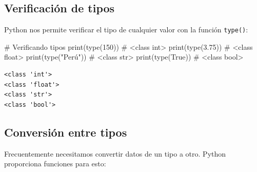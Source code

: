 \documentclass[
  doc,
  floatsintext,
  longtable,
  a4paper,
  nolmodern,
  notxfonts,
  notimes,
  12pt,
  colorlinks=true,linkcolor=blue,citecolor=blue,urlcolor=blue]{apa7}
\newenvironment{Shaded}{\begin{snugshade}}{\end{snugshade}}
\newcommand{\BuiltInTok}[1]{\textcolor[rgb]{0.00,0.23,0.31}{#1}}
\newcommand{\CommentTok}[1]{\textcolor[rgb]{0.37,0.37,0.37}{#1}}
\newcommand{\DecValTok}[1]{\textcolor[rgb]{0.68,0.00,0.00}{#1}}
\newcommand{\FloatTok}[1]{\textcolor[rgb]{0.68,0.00,0.00}{#1}}
\newcommand{\NormalTok}[1]{\textcolor[rgb]{0.00,0.23,0.31}{#1}}
\newcommand{\StringTok}[1]{\textcolor[rgb]{0.13,0.47,0.30}{#1}}
\newcommand{\VariableTok}[1]{\textcolor[rgb]{0.07,0.07,0.07}{#1}}
\begin{document}
\subsection{Verificación de tipos}\label{verificaciuxf3n-de-tipos}

Python nos permite verificar el tipo de cualquier valor con la función
\texttt{type()}:

\begin{Shaded}
\begin{Highlighting}[]
\CommentTok{\# Verificando tipos}
\BuiltInTok{print}\NormalTok{(}\BuiltInTok{type}\NormalTok{(}\DecValTok{150}\NormalTok{))           }\CommentTok{\# \textless{}class \textquotesingle{}int\textquotesingle{}\textgreater{}}
\BuiltInTok{print}\NormalTok{(}\BuiltInTok{type}\NormalTok{(}\FloatTok{3.75}\NormalTok{))          }\CommentTok{\# \textless{}class \textquotesingle{}float\textquotesingle{}\textgreater{}}
\BuiltInTok{print}\NormalTok{(}\BuiltInTok{type}\NormalTok{(}\StringTok{"Perú"}\NormalTok{))        }\CommentTok{\# \textless{}class \textquotesingle{}str\textquotesingle{}\textgreater{}}
\BuiltInTok{print}\NormalTok{(}\BuiltInTok{type}\NormalTok{(}\VariableTok{True}\NormalTok{))          }\CommentTok{\# \textless{}class \textquotesingle{}bool\textquotesingle{}\textgreater{}}
\end{Highlighting}
\end{Shaded}

\begin{verbatim}
<class 'int'>
<class 'float'>
<class 'str'>
<class 'bool'>
\end{verbatim}

\subsection{Conversión entre tipos}\label{conversiuxf3n-entre-tipos}

Frecuentemente necesitamos convertir datos de un tipo a otro. Python
proporciona funciones para esto:
\end{document}
